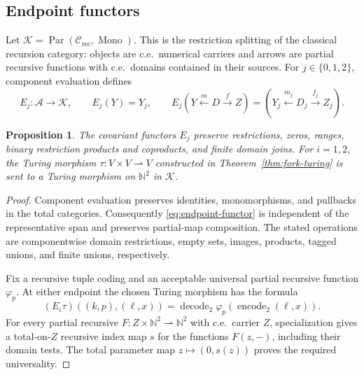 \documentclass[11pt]{article}
\newtheorem{proposition}[theorem]{Proposition}
\newcommand{\N}{\mathbb N}
\begin{document}
\subsection{Endpoint functors}

Let
$\mathcal K=\operatorname{Par}(\mathcal C_{\mathrm{rec}},\operatorname{Mono})$.
This is the restriction splitting of the classical recursion category:
objects are c.e.\ numerical carriers and arrows are partial recursive
functions with c.e.\ domains contained in their sources.
For $j\in\{0,1,2\}$, component evaluation defines
\begin{equation}\label{eq:endpoint-functor}
 E_j:\mathcal A\longrightarrow\mathcal K,\qquad
 E_j(Y)=Y_j,\qquad
 E_j(Y\xleftarrow{m}D\xrightarrow{f}Z)
   =(Y_j\xleftarrow{m_j}D_j\xrightarrow{f_j}Z_j).
\end{equation}

\begin{proposition}\label{prop:endpoint}
The covariant functors $E_j$ preserve restrictions, zeros, ranges,
binary restriction products and coproducts, and finite domain joins.
For $i=1,2$, the Turing morphism
$\tau:V\times V\rightharpoonup V$ constructed in
Theorem~\ref{thm:fork-turing} is sent
to a Turing morphism on $\N^2$ in $\mathcal K$.
\end{proposition}
\begin{proof}
Component evaluation preserves identities, monomorphisms, and
pullbacks in the total categories. Consequently \eqref{eq:endpoint-functor}
is independent of the representative span and preserves partial-map
composition. The stated operations are componentwise domain
restrictions, empty sets, images, products, tagged unions, and finite
unions, respectively.

Fix a recursive tuple coding and an acceptable universal partial
recursive function $\varphi_p$. At either endpoint the chosen
Turing morphism has the formula
\[
 (E_i\tau)((k,p),(\ell,x))
 =\operatorname{decode}_2\varphi_p(\operatorname{encode}_2(\ell,x)).
\]
For every partial recursive
$F:Z\times\N^2\rightharpoonup\N^2$ with c.e.\ carrier $Z$,
specialization gives a total-on-$Z$ recursive index map $s$ for
the functions $F(z,-)$, including their domain tests.
The total parameter map $z\mapsto(0,s(z))$ proves the required
universality.
\end{proof}
\end{document}
